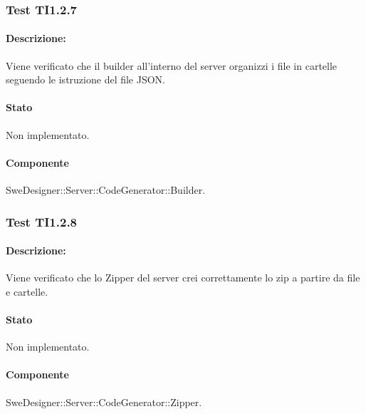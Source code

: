 \documentclass[../PianoDiQualifica.tex]{subfiles}
\begin{document}
	\subsubsection{Test TI1.2.7}
	\paragraph{Descrizione:} Viene verificato che il builder all'interno del server organizzi i file in cartelle seguendo le istruzione del file JSON.
	\paragraph{Stato} Non implementato.
	\paragraph{Componente} SweDesigner::Server::CodeGenerator::Builder.
	
	\subsubsection{Test TI1.2.8}
	\paragraph{Descrizione:} Viene verificato che lo Zipper del server crei correttamente lo zip a partire da file e cartelle.
	\paragraph{Stato} Non implementato.
	\paragraph{Componente} SweDesigner::Server::CodeGenerator::Zipper.
	
	
\end{document}
